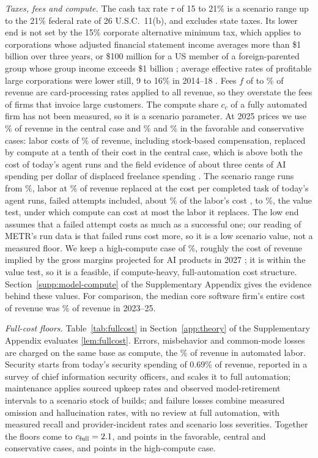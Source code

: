\emph{Taxes, fees and compute.} The cash tax rate $\tau$ of 15 to 21\% is a scenario range up to the 21\% federal rate of 26 U.S.C.\ 11(b), and excludes state taxes. Its lower end is not set by the 15\% corporate alternative minimum tax, which applies to corporations whose adjusted financial statement income averages more than \$1 billion over three years, or \$100 million for a US member of a foreign-parented group whose group income exceeds \$1 billion \citep{usc2026sec59}; average effective rates of profitable large corporations were lower still, 9 to 16\% in 2014--18 \citep{gao2022effective}. Fees $f$ of \FeeLo{} to \FeeHi\% of revenue are card-processing rates applied to all revenue, so they overstate the fees of firms that invoice large customers. The compute share $c_c$ of a fully automated firm has not been measured, so it is a scenario parameter. At 2025 prices we use \CcCen\% of revenue in the central case and \CcFav\% and \CcCons\% in the favorable and conservative cases: labor costs of \CcLaborShare\% of revenue, including stock-based compensation, replaced by compute at a tenth of their cost in the central case, which is above both the cost of today's agent runs and the field evidence of about three cents of AI spending per dollar of displaced freelance spending \citep{stevens2026payrolls}. The scenario range runs from \CcLo\%, labor at \CcLaborShare\% of revenue replaced at the cost per completed task of today's agent runs, failed attempts included, about \KappaLo\% of the labor's cost \citep{kwa2025measuring,metr2026evalanalysis}, to \CcHi\%, the value test, under which compute can cost at most the labor it replaces. The low end assumes that a failed attempt costs as much as a successful one; our reading of METR's run data is that failed runs cost more, so it is a low scenario value, not a measured floor. We keep a high-compute case of \CcHigh\%, roughly the cost of revenue implied by the gross margins projected for AI products in 2027 \citep{iconiq2026state}; it is within the value test, so it is a feasible, if compute-heavy, full-automation cost structure. Section~\ref{supp:model-compute} of the Supplementary Appendix gives the evidence behind these values. For comparison, the median core software firm's entire cost of revenue was \MedCostRevenue\% of revenue in 2023--25.

\emph{Full-cost floors.} Table~\ref{tab:fullcost} in Section~\ref{app:theory} of the Supplementary Appendix evaluates \autoref{lem:fullcost}. Errors, misbehavior and common-mode losses are charged on the same base as compute, the \ErrBase\% of revenue in automated labor. Security starts from today's security spending of 0.69\% of revenue, reported in a survey of chief information security officers, and scales it to full automation; maintenance applies sourced upkeep rates and observed model-retirement intervals to a scenario stock of builds; and failure losses combine measured omission and hallucination rates, with no review at full automation, with measured recall and provider-incident rates and scenario loss severities. Together the floors come to $c_{\mathrm{full}}=2.1$, \CfullCen{} and \CfullCons{} points in the favorable, central and conservative cases, and \CfullHigh{} points in the high-compute case.

